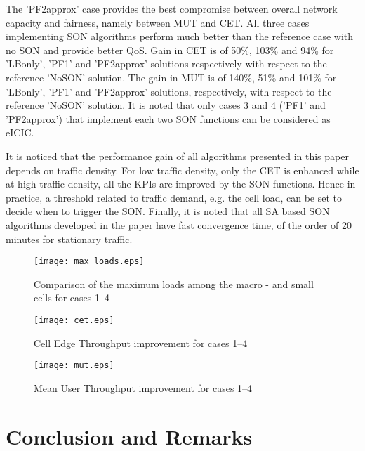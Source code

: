 \documentclass[conference]{IEEEtran}
\begin{document}
The 'PF2approx' case provides the best compromise between overall network capacity and fairness, namely between \ac{MUT} and \ac{CET}. All three cases implementing \ac{SON} algorithms perform much better than the reference case with no \ac{SON} and provide better \ac{QoS}. Gain in \ac{CET} is of 50\%, 103\% and 94\% for 'LBonly', 'PF1' and 'PF2approx' solutions respectively with respect to the reference 'NoSON' solution. The gain in \ac{MUT} is of 140\%, 51\% and 101\% for 'LBonly', 'PF1' and 'PF2approx' solutions, respectively, with respect to the reference 'NoSON' solution. It is noted that only cases 3 and 4 ('PF1' and 'PF2approx') that implement each two \ac{SON} functions can be considered as \ac{eICIC}.

It is noticed that the performance gain of all algorithms presented in this paper depends on traffic density. For low traffic density, only the \ac{CET} is enhanced while at high traffic density, all the \acp{KPI} are improved by the \ac{SON} functions. Hence in practice, a threshold related to traffic demand, e.g. the cell load, can be set to decide when to trigger the SON. Finally, it is noted that all \ac{SA} based \ac{SON} algorithms developed in the paper have fast convergence time, of the order of 20 minutes for stationary traffic.
	
\begin{figure}[!ht]
\centering
\texttt{[image: max\_loads.eps]}
\caption{Comparison of the maximum loads among the macro - and small cells for cases 1--4}
\label{fig:max_loads}
\end{figure}

\begin{figure}[!ht]
\centering
\texttt{[image: cet.eps]}
\caption{Cell Edge Throughput improvement for cases 1--4}
\label{fig:cet}
\end{figure}

\begin{figure}[!ht]
\centering
\texttt{[image: mut.eps]}
\caption{Mean User Throughput improvement for cases 1--4}
\label{fig:mut}
\end{figure}

\section{Conclusion and Remarks} \label{sec:conclusion}
\end{document}
